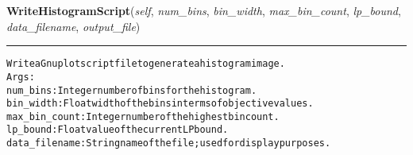 \hspace{.8\funcindent}\begin{boxedminipage}{\funcwidth}

    \raggedright \textbf{WriteHistogramScript}(\textit{self}, \textit{num\_bins}, \textit{bin\_width}, \textit{max\_bin\_count}, \textit{lp\_bound}, \textit{data\_filename}, \textit{output\_file})

    \vspace{-1.5ex}

    \rule{\textwidth}{0.5\fboxrule}
\setlength{\parskip}{2ex}
\begin{alltt}

Write a Gnuplot script file to generate a histogram image.
Args:
  num\_bins: Integer number of bins for the histogram.
  bin\_width: Float width of the bins in terms of objective values.
  max\_bin\_count: Integer number of the highest bin count.
  lp\_bound: Float value of the current LP bound.
  data\_filename: String name of the file; used for display purposes.
\end{alltt}

\setlength{\parskip}{1ex}
    \end{boxedminipage}

    \label{coinor:grumpy:BB:BBTree:AdjustHistogramEndBins}

    \vspace{0.5ex}

